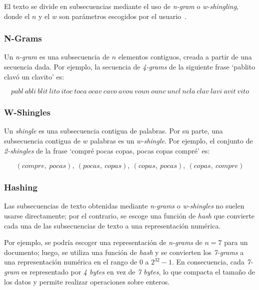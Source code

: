 El texto se divide en subsecuencias mediante el uso de \textit{n-gram} o \textit{w-shingling},
donde el $n$ y el $w$ son parámetros escogidos por el usuario~\cite{Beth2014ACO}.

\subsubsection{N-Grams}

Un \textit{n-gram} es una subsecuencia de $n$ elementos contiguos,
creada a partir de una secuencia dada. Por ejemplo, 
la secuencia de \textit{4-grams} de la siguiente frase
‘pablito clavó un clavito’ es:

\begin{equation*}
pabl\ abli\ blit\ lito\ itoc\ toca\ ocav\ cavo\ avou\ voun\ ounc\ uncl\ ncla\ clav\ lavi\ avit\ vito
\end{equation*}

\subsubsection{W-Shingles}

Un \textit{shingle} es una subsecuencia contigua de palabras. 
Por su parte, una subsecuencia contigua de $w$ palabras es un \textit{w-shingle}.
Por ejemplo, el conjunto de \textit{2-shingles} de la frase ‘compré pocas copas, pocas copas compré’ es:

\begin{equation*}
(compre,\ pocas),\ (pocas,\ copas),\ (copas,\ pocas),\ (copas,\ compre)
\end{equation*}

\subsubsection{Hashing}

Las subsecuencias de texto obtenidas mediante \textit{n-grams}
o \textit{w-shingles} no suelen usarse directamente;
por el contrario, se escoge una función de \textit{hash} que convierte cada una de las
subsecuencias de texto a una representación numérica.

Por ejemplo, se podría escoger una representación de \textit{n-grams} de $n = 7$
para un documento; luego, se utiliza una función de \textit{hash} y 
se convierten los \textit{7-grams} a una representación numérica
en el rango de $0$ a $2^{32} - 1$. 
En consecuencia, cada \textit{7-gram} es representado por \textit{4 bytes} en vez de \textit{7 bytes},
lo que compacta el tamaño de los datos y permite realizar operaciones sobre enteros.

